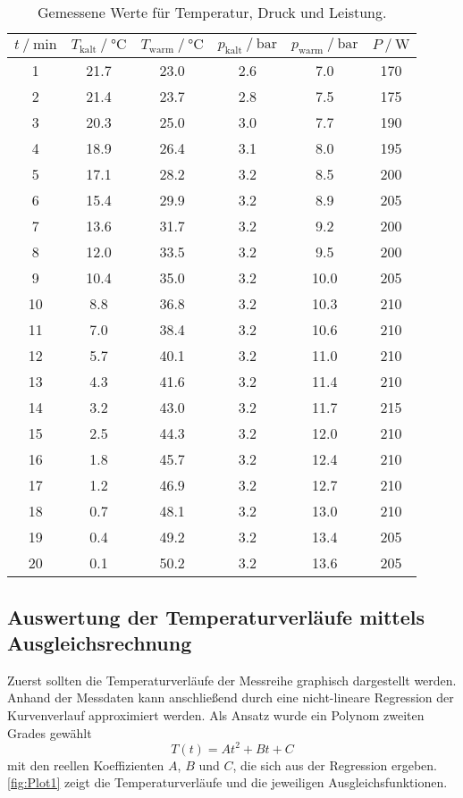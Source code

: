 \begin{table}
  \centering
  \caption{Gemessene Werte für Temperatur, Druck und Leistung.}
  \label{tab:Mess1}
  \begin{tabular}{S[table-format=2] S[table-format=2.1] S S[table-format=1.1] S S[table-format=3]}
      \toprule
      {$t \mathbin{/} \text{min}$} & {$T_{\text{kalt}} \mathbin{/} \unit{\degreeCelsius}$} &%
      {$T_{\text{warm}} \mathbin{/} \unit{\degreeCelsius}$} & {$p_{\text{kalt}} \mathbin{/} \unit{\bar}$} &%
      {$p_{\text{warm}} \mathbin{/} \unit{\bar}$} & {$P \mathbin{/} \unit{\watt}$} \\
       & 21.7 & 23.0 & 2.6 &  7.0 & 170 \\
       2 & 21.4 & 23.7 & 2.8 &  7.5 & 175 \\
       3 & 20.3 & 25.0 & 3.0 &  7.7 & 190 \\
       4 & 18.9 & 26.4 & 3.1 &  8.0 & 195 \\
       5 & 17.1 & 28.2 & 3.2 &  8.5 & 200 \\
       6 & 15.4 & 29.9 & 3.2 &  8.9 & 205 \\
       7 & 13.6 & 31.7 & 3.2 &  9.2 & 200 \\
       8 & 12.0 & 33.5 & 3.2 &  9.5 & 200 \\
       9 & 10.4 & 35.0 & 3.2 & 10.0 & 205 \\
      10 &  8.8 & 36.8 & 3.2 & 10.3 & 210 \\
      11 &  7.0 & 38.4 & 3.2 & 10.6 & 210 \\
      12 &  5.7 & 40.1 & 3.2 & 11.0 & 210 \\
      13 &  4.3 & 41.6 & 3.2 & 11.4 & 210 \\
      14 &  3.2 & 43.0 & 3.2 & 11.7 & 215 \\
      15 &  2.5 & 44.3 & 3.2 & 12.0 & 210 \\
      16 &  1.8 & 45.7 & 3.2 & 12.4 & 210 \\
      17 &  1.2 & 46.9 & 3.2 & 12.7 & 210 \\
      18 &  0.7 & 48.1 & 3.2 & 13.0 & 210 \\
      19 &  0.4 & 49.2 & 3.2 & 13.4 & 205 \\
      20 &  0.1 & 50.2 & 3.2 & 13.6 & 205 \\
      \bottomrule
      \end{tabular}
  \end{table}

\subsection{Auswertung der Temperaturverläufe mittels Ausgleichsrechnung}
\label{subsec:Temperaturverlauf}
Zuerst sollten die Temperaturverläufe der Messreihe graphisch dargestellt werden. Anhand der Messdaten kann anschließend durch eine nicht-lineare Regression der Kurvenverlauf 
approximiert werden. Als Ansatz wurde ein Polynom zweiten Grades gewählt
\begin{equation*}
  T(t) = At^2 + Bt + C
\end{equation*}
mit den reellen Koeffizienten $A$, $B$ und $C$, die sich aus der Regression ergeben. \autoref{fig:Plot1} zeigt die Temperaturverläufe und die jeweiligen Ausgleichsfunktionen.


